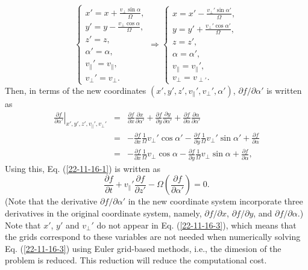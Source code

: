 \documentclass{llncs}
\begin{document}
\begin{equation}
  \left\{ \begin{array}{c}
    x' = x + \frac{v_{\perp} \sin \alpha}{\Omega},\\
    y' = y - \frac{v_{\perp} \cos \alpha}{\Omega},\\
    z' = z,\\
    \alpha' = \alpha,\\
    v_{\parallel}' = v_{\parallel},\\
    v_{\perp}' = v_{\perp} .
  \end{array} \right. \Rightarrow \left\{ \begin{array}{c}
    x = x' - \frac{v_{\perp}' \sin \alpha'}{\Omega},\\
    y = y' + \frac{v_{\perp}' \cos \alpha'}{\Omega},\\
    z = z',\\
    \alpha = \alpha',\\
    v_{\parallel} = v_{\parallel}',\\
    v_{\perp} = v_{\perp'} .
  \end{array} \right.
\end{equation}
Then, in terms of the new coordinates $(x', y', z', v_{\parallel}',
v_{\perp}', \alpha')$, $\partial f / \partial \alpha'$ is written as
\begin{eqnarray}
  \left. \frac{\partial f}{\partial \alpha'} \right|_{x', y', z',
  v_{\parallel}', v_{\perp}'} & = & \frac{\partial f}{\partial x} 
  \frac{\partial x}{\partial \alpha'} + \frac{\partial f}{\partial y} 
  \frac{\partial y}{\partial \alpha'} + \frac{\partial f}{\partial \alpha} 
  \frac{\partial \alpha}{\partial \alpha'} \nonumber\\
  & = & - \frac{\partial f}{\partial x}  \frac{1}{\Omega} v_{\perp}' \cos
  \alpha' - \frac{\partial f}{\partial y}  \frac{1}{\Omega} v_{\perp}' \sin
  \alpha' + \frac{\partial f}{\partial \alpha} \nonumber\\
  & = & - \frac{\partial f}{\partial x}  \frac{1}{\Omega} v_{\perp} \cos
  \alpha - \frac{\partial f}{\partial y}  \frac{1}{\Omega} v_{\perp} \sin
  \alpha + \frac{\partial f}{\partial \alpha}, 
\end{eqnarray}
Using this, Eq. (\ref{22-11-16-1}) is written as
\begin{equation}
  \label{22-11-16-3} \frac{\partial f}{\partial t} + v_{\parallel}'
  \frac{\partial f}{\partial z'} - \Omega \left( \frac{\partial f}{\partial
  \alpha'} \right) = 0.
\end{equation}
(Note that the derivative $\partial f / \partial \alpha'$ in the new
coordinate system incorporate three derivatives in the original coordinate
system, namely, $\partial f / \partial x$, $\partial f / \partial y$, and
$\partial f / \partial \alpha$.) Note that $x'$, $y'$ and $v_{\perp}'$ do not
appear in Eq. (\ref{22-11-16-3}), which means that the grids correspond to
these variables are not needed when numerically solving Eq. (\ref{22-11-16-3})
using Euler grid-based methods, i.e., the dimesion of the problem is reduced.
This reduction will reduce the computational cost.
\end{document}
